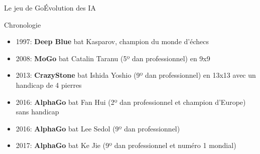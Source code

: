 \begin{frame}{Le jeu de Go}{Évolution des IA}
    \begin{block}{Chronologie}
        \begin{itemize}
            \item 1997: \textbf{Deep Blue} bat Kasparov, champion du monde d'échecs
            \item 2008: \textbf{MoGo} bat Catalin Taranu (5º dan professionnel) en 9x9
            \item 2013: \textbf{CrazyStone} bat Ishida Yoshio (9º dan professionnel) en 13x13 avec un handicap de 4 pierres
            \item 2016: \textbf{AlphaGo} bat Fan Hui (2º dan professionnel et champion d'Europe) sans handicap
            \item 2016: \textbf{AlphaGo} bat Lee Sedol (9º dan professionnel)
            \item 2017: \textbf{AlphaGo} bat Ke Jie (9º dan professionnel et numéro 1 mondial)
        \end{itemize}
    \end{block}
\end{frame}
